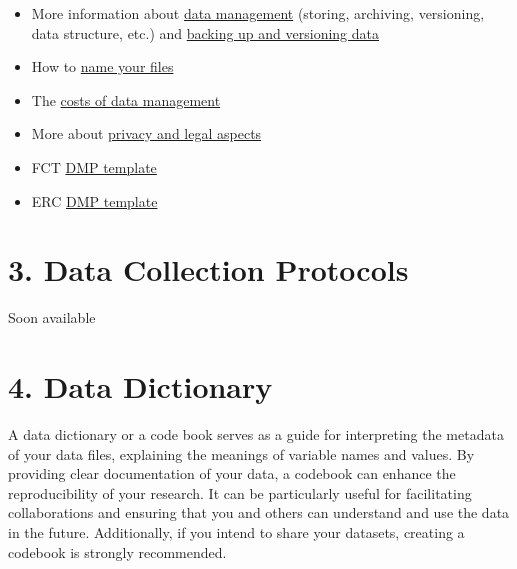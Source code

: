 \documentclass[
  letterpaper,
  DIV=11,
  numbers=noendperiod]{scrreprt}
\begin{document}

\begin{itemize}
\item
  More information about
  \href{https://www.uu.nl/en/research/research-data-management/guides/storing-and-preserving-data}{data
  management} (storing, archiving, versioning, data structure, etc.) and
  \href{https://www.openaire.eu/raw-data-backup-and-versioning}{backing
  up and versioning data}
\item
  How to \href{https://speakerdeck.com/jennybc/how-to-name-files}{name
  your files}
\item
  The
  \href{https://www.uu.nl/en/research/research-data-management/guides/costs-of-data-management}{costs
  of data management}
\item
  More about
  \href{https://www.eur.nl/en/library/research-support/research-data-management-rdm/privacy-and-legal-aspects}{privacy
  and legal aspects}
\item
  FCT
  \href{https://myfct.fct.pt/LibDocument/DocumentPatterns.FileDisplay.aspx?EcrypDoctId=omRid7suIkRYq\%2BIqLH1qkQ\%3D\%3D}{DMP
  template}
\item
  ERC
  \href{https://erc.europa.eu/sites/default/files/document/file/ERC-Data-Management-Plan.docx}{DMP
  template}
\end{itemize}


\hypertarget{data-collection-protocols-1}{%
\chapter*{3. Data Collection
Protocols}\label{data-collection-protocols-1}}


Soon available


\hypertarget{data-dictionary-1}{%
\chapter*{4. Data Dictionary}\label{data-dictionary-1}}


A data dictionary or a code book serves as a guide for interpreting the
metadata of your data files, explaining the meanings of variable names
and values. By providing clear documentation of your data, a codebook
can enhance the reproducibility of your research. It can be particularly
useful for facilitating collaborations and ensuring that you and others
can understand and use the data in the future. Additionally, if you
intend to share your datasets, creating a codebook is strongly
recommended.
\end{document}
